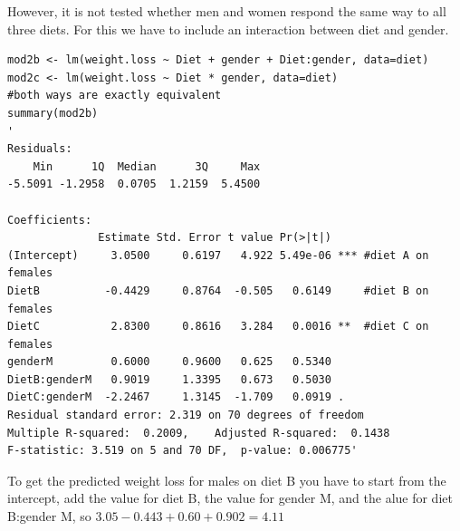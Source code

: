 \documentclass{article}
\begin{document}
However, it is not tested whether men and women respond the same way to all three diets. For this we have to include an interaction between diet and gender. 
\begin{lstlisting}
mod2b <- lm(weight.loss ~ Diet + gender + Diet:gender, data=diet)
mod2c <- lm(weight.loss ~ Diet * gender, data=diet)
#both ways are exactly equivalent
summary(mod2b)
'
Residuals:
    Min      1Q  Median      3Q     Max 
-5.5091 -1.2958  0.0705  1.2159  5.4500 

Coefficients:
              Estimate Std. Error t value Pr(>|t|)    
(Intercept)     3.0500     0.6197   4.922 5.49e-06 *** #diet A on females
DietB          -0.4429     0.8764  -0.505   0.6149     #diet B on females
DietC           2.8300     0.8616   3.284   0.0016 **  #diet C on females
genderM         0.6000     0.9600   0.625   0.5340     
DietB:genderM   0.9019     1.3395   0.673   0.5030    
DietC:genderM  -2.2467     1.3145  -1.709   0.0919 .  
Residual standard error: 2.319 on 70 degrees of freedom
Multiple R-squared:  0.2009,	Adjusted R-squared:  0.1438 
F-statistic: 3.519 on 5 and 70 DF,  p-value: 0.006775'
\end{lstlisting}
To get the predicted weight loss for males on diet B you have to start from the intercept, add the value for diet B, the value for gender M, and the alue for diet B:gender M, so $3.05 -0.443 +0.60 +0.902 = 4.11$
\end{document}
